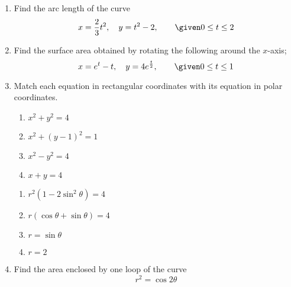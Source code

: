 \begin{enumerate}
  \vspace{3em}
  \item Find the arc length of the curve
    \[%
      x = \frac{2}{3}t^2, \quad y = t^2 - 2, \qquad \given 0 \leq t \leq 2
    \]%


\newpage %

  \item Find the surface area obtained by rotating the following around the
    \(x\)-axis;
    \[%
    x = e^t - t, \quad y = 4e^{\frac{t}{2}}, \qquad \given 0 \leq t \leq 1
    \]%


\newpage %

  \item Match each equation in rectangular coordinates with its equation in
    polar coordinates.

  \begin{multicols}{2}
    \begin{enumerate}
      \item \(x^2 + y^2 = 4\)
      \item \(x^2 + (y-1)^2 = 1\)
      \item \(x^2 - y^2 = 4\)
      \item \(x + y = 4\)
    \end{enumerate}

    \begin{enumerate}[label=(\roman*)]
      \item \(r^2 (1- 2 \sin ^2 \theta) = 4\)
      \item \(r (\cos \theta + \sin \theta ) = 4\)
      \item \(r = \sin \theta\)
      \item \(r = 2 \)
    \end{enumerate}
  \end{multicols}

  \vspace{8em}

  \item Find the area enclosed by one loop of the curve
    \[%
    r^2 = \cos 2\theta
    \]%

\end{enumerate}
